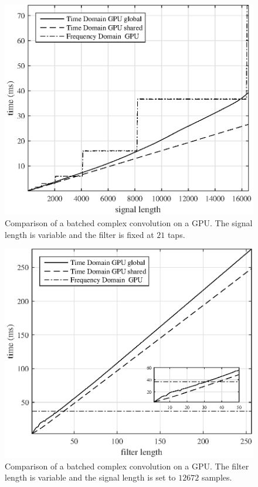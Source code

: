 \begin{figure}
	\centering\includegraphics[width=5in]{figures/gpu_intro/CPUvsGPU_3104batch_21taps_varySignal.eps}
	\caption{Comparison of a batched complex convolution on a GPU. The signal length is variable and the filter is fixed at $21$ taps.}
	\label{fig:CPUvsGPU_3104batch_21taps_varySignal}
\end{figure}
\begin{figure}
	\centering\includegraphics[width=5in]{figures/gpu_intro/CPUvsGPU_3104batch_12672signal_varyFilter.eps}
	\caption{Comparison of a batched complex convolution on a GPU. The filter length is variable and the signal length is set to $12672$ samples.}
	\label{fig:CPUvsGPU_3104batch_12672signal_varyFilter}
\end{figure}
